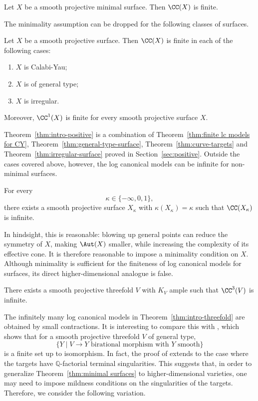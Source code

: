 \documentclass[12pt]{amsart}
\begin{document}
\begin{theorem}\label{thm:minimal surfaces}
  Let $X$ be a smooth projective minimal surface. Then $\CC(X)$ is finite.
\end{theorem}

The minimality assumption can be dropped for the following classes of 
surfaces. 

\begin{theorem}\label{thm:intro-positive}
Let $X$ be a smooth projective surface. Then $\CC(X)$ is finite in each of the following cases:
\begin{enumerate}
  \item $X$ is Calabi-Yau;
\item $X$ is of general type;
\item $X$ is irregular.
\end{enumerate}
Moreover, $\CC^1(X)$ is finite for every smooth projective surface $X$.
\end{theorem}


Theorem~\ref{thm:intro-positive} is a combination of Theorem~\ref{thm:finite lc models for CY}, Theorem~\ref{thm:general-type-surface}, Theorem~\ref{thm:curve-targets} and Theorem~\ref{thm:irregular-surface} proved in Section~\ref{sec:positive}. Outside the cases covered above, however, the log canonical models can be infinite for non-minimal surfaces.

\begin{theorem}\label{thm:surface-counterexamples}
For every
\[
 \kappa\in\{-\infty,0,1\},
\]
there exists a smooth projective surface $X_\kappa$ with $\kappa(X_\kappa)=\kappa$ such that $\CC(X_\kappa)$ is infinite.
\end{theorem}

In hindsight, this is reasonable: blowing up general points can reduce the symmetry of $X$, making $\Aut(X)$ smaller, while increasing the complexity of its effective cone. It is therefore reasonable to impose a minimality condition on $X$. Although minimality is sufficient for the finiteness of log canonical models for surfaces, its direct higher-dimensional analogue is false.

\begin{theorem}\label{thm:intro-threefold}
There exists a smooth projective threefold $V$ with $K_V$ ample such that $\CC^3(V)$ is infinite.
\end{theorem}

The infinitely many log canonical models in Theorem~\ref{thm:intro-threefold}
are obtained by small contractions. It is interesting to compare this with
\cite[Theorem~4]{Tsa97}, which shows that for a smooth projective threefold
$V$ of general type,
\[
\{Y \mid V \to Y \text{ birational morphism with } Y \text{ smooth}\}
\]
is a finite set up to isomorphism. In fact, the proof of
\cite[Theorem~4]{Tsa97} extends to the case where the targets have
$\mathbb Q$-factorial terminal singularities. This suggests that, in order
to generalize Theorem~\ref{thm:minimal surfaces} to higher-dimensional
varieties, one may need to impose mildness conditions on the singularities
of the targets. Therefore, we consider the following variation.
\end{document}
